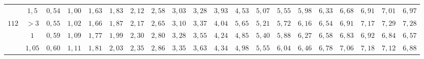 \begin{table}[]
{\begin{tabular}{|c|c|c|c|c|c|c|c|c|c|c|c|c|c|c|c|c|c|c|c|}
                        & $1,5$                                                                               & \cellcolor[HTML]{FFCCC9}$0,54$ & \cellcolor[HTML]{FFCCC9}$1,00$ & \cellcolor[HTML]{FFCCC9}$1,63$ & \cellcolor[HTML]{FFCCC9}$1,83$ & \cellcolor[HTML]{FD6864}$2,12$ & \cellcolor[HTML]{FD6864}$2,58$ & \cellcolor[HTML]{FD6864}$3,03$ & \cellcolor[HTML]{FD6864}$3,28$ & \cellcolor[HTML]{FE0000}$3,93$ & \cellcolor[HTML]{FE0000}$4,53$ & \cellcolor[HTML]{CB0000}$5,07$ & \cellcolor[HTML]{CB0000}$5,55$ & \cellcolor[HTML]{9A0000}$5,98$                        & \cellcolor[HTML]{9A0000}$6,33$ & \cellcolor[HTML]{F8A102}$6,68$ & \cellcolor[HTML]{F8A102}$6,91$ & \cellcolor[HTML]{F56B00}$7,01$ & \cellcolor[HTML]{CE6301}$6,97$ \\ \cline{2-20} 
\multirow{-5}{*}{$112$} & $>3$                                                                                & \cellcolor[HTML]{FFCCC9}$0,55$ & \cellcolor[HTML]{FFCCC9}$1,02$ & \cellcolor[HTML]{FFCCC9}$1,66$ & \cellcolor[HTML]{FFCCC9}$1,87$ & \cellcolor[HTML]{FD6864}$2,17$ & \cellcolor[HTML]{FD6864}$2,65$ & \cellcolor[HTML]{FD6864}$3,10$ & \cellcolor[HTML]{FD6864}$3,37$ & \cellcolor[HTML]{FE0000}$4,04$ & \cellcolor[HTML]{FE0000}$5,65$ & \cellcolor[HTML]{CB0000}$5,21$ & \cellcolor[HTML]{CB0000}$5,72$ & \cellcolor[HTML]{9A0000}$6,16$                        & \cellcolor[HTML]{9A0000}$6,54$ & \cellcolor[HTML]{F8A102}$6,91$ & \cellcolor[HTML]{F8A102}$7,17$ & \cellcolor[HTML]{F56B00}$7,29$ & \cellcolor[HTML]{CE6301}$7,28$ \\ \hline
                        & $1$                                                                                 & \cellcolor[HTML]{FFCCC9}$0,59$ & \cellcolor[HTML]{FFCCC9}$1,09$ & \cellcolor[HTML]{FFCCC9}$1,77$ & \cellcolor[HTML]{FD6864}$1,99$ & \cellcolor[HTML]{FD6864}$2,30$ & \cellcolor[HTML]{FD6864}$2,80$ & \cellcolor[HTML]{FD6864}$3,28$ & \cellcolor[HTML]{FE0000}$3,55$ & \cellcolor[HTML]{FE0000}$4,24$ & \cellcolor[HTML]{CB0000}$4,85$ & \cellcolor[HTML]{CB0000}$5,40$ & \cellcolor[HTML]{9A0000}$5,88$ & \cellcolor[HTML]{9A0000}$6,27$                        & \cellcolor[HTML]{F8A102}$6,58$ & \cellcolor[HTML]{F8A102}$6,83$ & \cellcolor[HTML]{F56B00}$6,92$ & \cellcolor[HTML]{CE6301}$6,84$ & \cellcolor[HTML]{CE6301}$6,57$ \\ \cline{2-20} 
                        & $1,05$                                                                              & \cellcolor[HTML]{FFCCC9}$0,60$ & \cellcolor[HTML]{FFCCC9}$1,11$ & \cellcolor[HTML]{FFCCC9}$1,81$ & \cellcolor[HTML]{FD6864}$2,03$ & \cellcolor[HTML]{FD6864}$2,35$ & \cellcolor[HTML]{FD6864}$2,86$ & \cellcolor[HTML]{FD6864}$3,35$ & \cellcolor[HTML]{FE0000}$3,63$ & \cellcolor[HTML]{FE0000}$4,34$ & \cellcolor[HTML]{CB0000}$4,98$ & \cellcolor[HTML]{CB0000}$5,55$ & \cellcolor[HTML]{9A0000}$6,04$ & \cellcolor[HTML]{9A0000}$6,46$                        & \cellcolor[HTML]{F8A102}$6,78$ & \cellcolor[HTML]{F8A102}$7,06$ & \cellcolor[HTML]{F56B00}$7,18$ & \cellcolor[HTML]{CE6301}$7,12$ & \cellcolor[HTML]{CE6301}$6,88$ \\ \cline{2-20} 

\end{tabular}}
\end{table}
